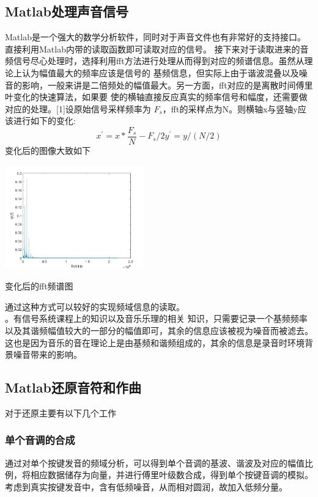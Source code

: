 \documentclass[a4paper,11pt,onecolumn,twoside]{article}
\makeatletter
\newenvironment{figurehere}
  {\def\@captype{figure}}
  {}
\makeatother
\begin{document}
\begin{CJK*}{UTF8}{gbsn}
\begin{multicols}{2}
\subsection {Matlab处理声音信号}
\indent Matlab是一个强大的数学分析软件，同时对于声音文件也有非常好的支持接口。直接利用Matlab内带的读取函数即可读取对应的信号。
接下来对于读取进来的音频信号尽心处理时，选择利用fft方法进行处理从而得到对应的频谱信息。虽然从理论上认为幅值最大的频率应该是信号的
基频信息，但实际上由于谐波混叠以及噪音的影响，一般来讲是二倍频处的幅值最大。另一方面，fft对应的是离散时间傅里叶变化的快速算法，如果要
使的横轴直接反应真实的频率信号和幅度，还需要做对应的处理。[1]设原始信号采样频率为 $F_s$，fft的采样点为N。则横轴x与竖轴y应该进行如下的变化:
\begin{equation}
			x^{'}=x*\frac{F_s}{N}-F_s/2
			y^{'}=y/(N/2)
\end{equation}
变化后的图像大致如下

\begin{figurehere}
\centering
\includegraphics[width=6cm]{../source/source_jpg/piano_a.jpg} \caption{变化后的fft频谱图}\label{theory—s}
\end{figurehere}
通过这种方式可以较好的实现频域信息的读取。\\
。有信号系统课程上的知识以及音乐乐理的相关
知识，只需要记录一个基频频率以及其谐频幅值较大的一部分的幅值即可，其余的信息应该被视为噪音而被滤去。这也是因为音乐的音在理论上是由基频和谐频组成的，其余的信息是录音时环境背景噪音带来的影响。\\

\subsection{Matlab还原音符和作曲}
\indent 对于还原主要有以下几个工作\\
\subsubsection{单个音调的合成}
\indent 通过对单个按键发音的频域分析，可以得到单个音调的基波、谐波及对应的幅值比例，将相应数据储存为向量，并进行傅里叶级数合成，得到单个按键音调的模拟。考虑到真实按键发音中，含有低频噪音，从而相对圆润，故加入低频分量。\\

\end{multicols}
\end{CJK*}
\end{document}
